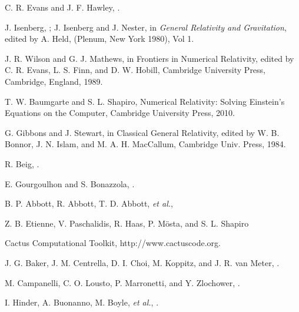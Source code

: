 C. R. Evans and J. F. Hawley, .

J. Isenberg, ; J. Isenberg and J. Nester, 
in \textit{General Relativity and Gravitation}, edited by A. Held, 
(Plenum, New York 1980), Vol 1.

J. R. Wilson and G. J. Mathews, in Frontiers in Numerical
Relativity, edited by C. R. Evans, L. S. Finn, and D. W. Hobill, 
Cambridge University Press, Cambridge, England, 1989.

T. W. Baumgarte and S. L. Shapiro, Numerical Relativity: Solving Einstein’s Equations on the Computer,
Cambridge University Press, 2010.

G. Gibbons and J. Stewart, in Classical General Relativity, edited by 
W. B. Bonnor, J. N. Islam, and M. A. H. MacCallum, Cambridge Univ. Press, 1984. 

R. Beig, .

E. Gourgoulhon and S. Bonazzola, .

B. P. Abbott, R. Abbott, T. D. Abbott, \textit{et al.}, 

Z. B. Etienne, V. Paschalidis, R. Haas, P.  M\"{o}sta, and S. L. Shapiro 


Cactus Computational Toolkit, http://www.cactuscode.org.


J. G. Baker, J. M. Centrella, D. I. Choi, M. Koppitz, and J. R. van Meter, .

M. Campanelli, C. O. Lousto, P. Marronetti, and Y. Zlochower, .

I. Hinder, A. Buonanno, M. Boyle, \textit{et al.}, . 

